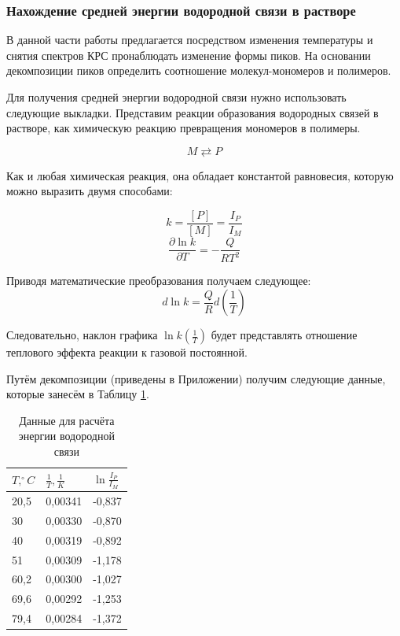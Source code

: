 \documentclass{article}
\begin{document}
\subsubsection{Нахождение средней энергии водородной связи в растворе}\;

\par В данной части работы предлагается посредством изменения температуры и снятия спектров КРС пронаблюдать изменение формы пиков. На основании декомпозиции пиков определить соотношение молекул-мономеров и полимеров. 

\par Для получения средней энергии водородной связи нужно использовать следующие выкладки. Представим реакции образования водородных связей в растворе, как химическую реакцию превращения мономеров в полимеры.

$$M \rightleftarrows P$$

\par Как и любая химическая реакция, она обладает константой равновесия, которую можно выразить двумя способами:

$$k = \frac{[P]}{[M]} = \frac{I_P}{I_M}$$
$$\frac{\partial \ln{k}}{\partial T} = - \frac{Q}{RT^2}$$

\par Приводя математические преобразования получаем следующее:
$$d \ln{k} = \frac{Q}{R}d \left(\frac{1}{T}\right)$$

\par Следовательно, наклон графика $\ln{k}\left(\frac{1}{T}\right)$ будет представлять отношение теплового эффекта реакции к газовой постоянной.

\par Путём декомпозиции (приведены в Приложении) получим следующие данные, которые занесём в Таблицу \ref{Вода}.

\begin{table}[h!]
\centering
\caption{Данные для расчёта энергии водородной связи}
\begin{tabular}{|l|l|l|}
\hline
$T, ^{\circ}C$ & $\frac{1}{T}, \frac{1}{K}$ & $\ln{\frac{I_P}{I_M}}$ \\ \hline
20,5 & 0,00341 & -0,837 \\ \hline
30 & 0,00330 & -0,870 \\ \hline
40 & 0,00319 & -0,892 \\ \hline
51 & 0,00309 & -1,178 \\ \hline
60,2 & 0,00300 & -1,027 \\ \hline
69,6 & 0,00292 & -1,253 \\ \hline
79,4 & 0,00284 & -1,372 \\ \hline
\end{tabular}
\label{Вода}
\end{table}
\end{document}
